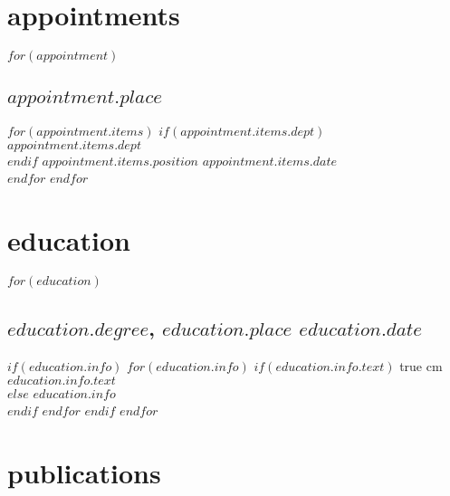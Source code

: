 \documentclass[11pt, letter]{article}
\title{}
\def\ind{\hangindent=1 true cm\hangafter=1 \noindent}
\begin{document}
\maketitle




\section{appointments}
$for(appointment)$
\subsection{$appointment.place$}
\vspace*{-0.2cm}

$for(appointment.items)$
 $if(appointment.items.dept)$
 \footnotesize{$appointment.items.dept$} \normalsize \\
 $endif$
$appointment.items.position$\hspace*{\fill} $appointment.items.date$ \\
$endfor$
$endfor$


\section{education}
$for(education)$
\subsection{$education.degree$, \textnormal{$education.place$ \hspace*{\fill}$education.date$}}

$if(education.info)$
$for(education.info)$
$if(education.info.text)$
\ind \hspace{0.35in} \footnotesize $education.info.text$ \normalsize \\
$else$
$education.info$ \\
$endif$
$endfor$
$endif$
$endfor$

\vspace{0.12in}

\section{publications}
\end{document}
